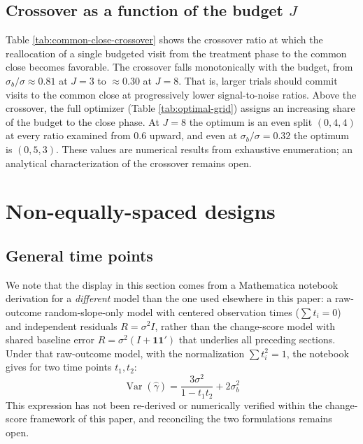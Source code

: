 \documentclass[
  11pt,
]{article}
\begin{document}
\subsection{\texorpdfstring{Crossover as a function of the budget \(J\)}{Crossover as a function of the budget J}}\label{crossover-as-a-function-of-the-budget-j}

Table \ref{tab:common-close-crossover} shows the
crossover ratio at which the reallocation of a single
budgeted visit from the treatment phase to the common
close becomes favorable. The crossover falls
monotonically with the budget, from
\(\sigma_b/\sigma \approx 0.81\) at \(J = 3\) to
\(\approx 0.30\) at \(J = 8\). That is, larger trials should
commit visits to the common close at progressively lower
signal-to-noise ratios. Above the crossover, the full
optimizer (Table \ref{tab:optimal-grid}) assigns an
increasing share of the budget to the close phase. At
\(J = 8\) the optimum is an even split \((0, 4, 4)\) at every
ratio examined from \(0.6\) upward, and even at
\(\sigma_b/\sigma = 0.32\) the optimum is \((0, 5, 3)\).
These values are numerical results from exhaustive
enumeration; an analytical characterization of the
crossover remains open.

\section{Non-equally-spaced designs}\label{non-equally-spaced-designs}

\subsection{General time points}\label{general-time-points}

We note that the display in this section comes from a
Mathematica notebook derivation for a \emph{different} model
than the one used elsewhere in this paper: a raw-outcome
random-slope-only model with centered observation times
(\(\sum t_i = 0\)) and independent residuals
\(R = \sigma^2 I\), rather than the change-score model
with shared baseline error
\(R = \sigma^2 (I + \mathbf{1}\mathbf{1}')\) that
underlies all preceding sections. Under that raw-outcome
model, with the normalization \(\sum t_i^2 = 1\), the
notebook gives for two time points \(t_1, t_2\):
\begin{equation}
  \mathop{\mathrm{Var}}(\hat\gamma) = \frac{3\sigma^2}{1 - t_1 t_2}
    + 2\sigma_b^2
\end{equation}
This expression has not been re-derived or numerically
verified within the change-score framework of this
paper, and reconciling the two formulations remains
open.
\end{document}
